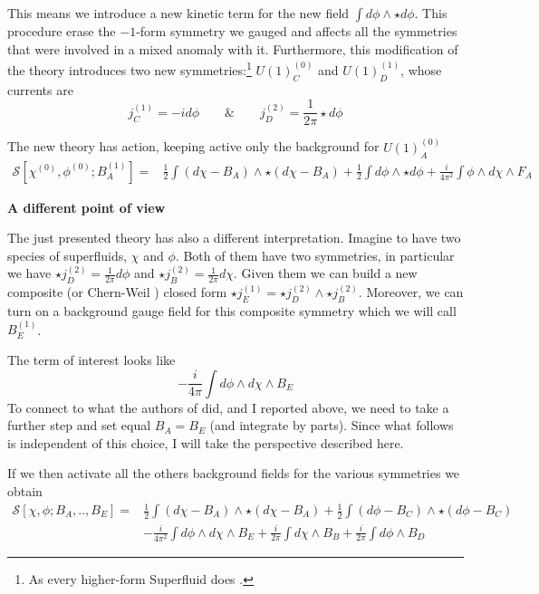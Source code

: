 \documentclass[aps,preprint,nofootinbib,preprintnumbers,eqsecnum,superscriptaddress]{revtex4}
\numberwithin{equation}{section}
\begin{document}
This means we introduce a new kinetic term for the new field $\int d\phi \wedge \star d\phi$. This procedure erase the $-1$-form symmetry we gauged and affects all the symmetries that were involved in a mixed anomaly with it. Furthermore, this modification of the theory introduces two new symmetries:\footnote{As every higher-form Superfluid does \cite{Delacr_taz_2020}.} $U(1)^{(0)}_C$ and $U(1)^{(1)}_D$, whose currents are
\begin{equation}
j^{(1)}_C = -id\phi \qquad \& \qquad j^{(2)}_D = \frac{1}{2\pi}\star d\phi
\end{equation}

The new theory has action, keeping active only the background for $U(1)^{(0)}_A$ 
\begin{align}
\mathcal{S}[\chi^{(0)}, \phi^{(0)}; B_A^{(1)}] = & \frac{1}{2}\int (d\chi - B_A) \wedge \star (d\chi - B_A)  +\frac{1}{2}\int d\phi \wedge \star d\phi  + \frac{i}{4 \pi^2} \int \phi \wedge d\chi \wedge F_A  
\end{align}


\begin{tcolorbox}
    {\bf A different point of view}
    
    The just presented theory has also a different interpretation. Imagine to have two species of superfluids, $\chi$ and $\phi$. Both of them have two symmetries, in particular we have $\star j^{(2)}_D = \frac{1}{2\pi}  d\phi$ and $\star j^{(2)}_B = \frac{1}{2\pi}  d\chi$. Given them we can build a new composite (or Chern-Weil \cite{Heidenreich_2021}) closed form $\star j^{(1)}_E = \star j^{(2)}_D \wedge \star j^{(2)}_B$. Moreover, we can turn on a background gauge field for this composite symmetry which we will call $B^{(1)}_E$.
    
    The term of interest looks like
    \begin{equation}
        -\frac{i}{4\pi} \int d\phi \wedge d\chi \wedge B_E
    \end{equation}
    To connect to what the authors of \cite{Damia_2023} did, and I reported above, we need to take a further step and set equal $B_A = B_E$ (and integrate by parts). Since what follows is independent of this choice, I will take the perspective described here.
\end{tcolorbox}

If we then activate all the others background fields for the various symmetries we obtain
\begin{align}
\mathcal{S}[\chi, \phi ; B_A,.., B_E ] = & \frac{1}{2}\int (d\chi - B_A)\wedge \star (d\chi - B_A) +\frac{1}{2}\int (d\phi - B_C)\wedge \star (d\phi - B_C) \\
&- \frac{i}{4 \pi^2} \int d\phi \wedge d\chi \wedge B_E + \frac{i}{2 \pi} \int d\chi \wedge B_B + \frac{i}{2 \pi} \int d\phi \wedge B_D 
\end{align}
\end{document}
